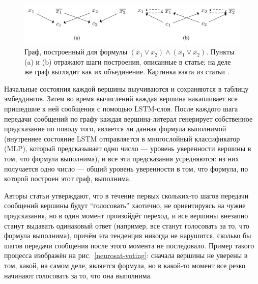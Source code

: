 \begin{figure}[ht]
\begin{center}
    \includegraphics[scale=0.25]{./assets/neurosat-mpnn.png}
    \caption{\label{neurosat-mpnn} Граф, построенный для формулы $(x_1 \vee x_2) \wedge (\overline{x_1} \vee \overline{x_2})$. Пункты (a) и (b) отражают шаги построения, описанные в статье; на деле же граф выглядит как их объединение. Картинка взята из статьи \cite{neurosat-paper}.}
\end{center}
\end{figure}

Начальные состояния каждой вершины выучиваются и сохраняются в таблицу эмбеддингов. Затем во время вычислений каждая вершина накапливает все пришедшие к ней сообщения с помощью LSTM-слоя. После каждого шага передачи сообщений по графу каждая вершина-литерал генерирует собственное предсказание по поводу того, является ли данная формула выполнимой (внутреннее состояние LSTM отправляется в многослойный классификатор (MLP), который предсказывает одно число --- уровень уверенности вершины в том, что формула выполнима), и все эти предсказания усредняются: из них получается одно число --- общий уровень уверенности в том, что формула, по которой построен этот граф, выполнима.

Авторы статьи утверждают, что в течение первых скольких-то шагов передачи сообщений вершины будут ``голосовать'' хаотично, не ориентируясь на чужие предсказания, но в один момент произойдёт переход, и все вершины внезапно станут выдавать одинаковый ответ (например, все станут голосовать за то, что формула выполнима), причём эта тенденция никогда не нарушится, сколько бы шагов передачи сообщения после этого момента не последовало. Пример такого процесса изображён на рис.~\ref{neurosat-voting}: сначала вершины не уверены в том, какой, на самом деле, является формула, но в какой-то момент все резко начинают голосовать за то, что она выполнима.

